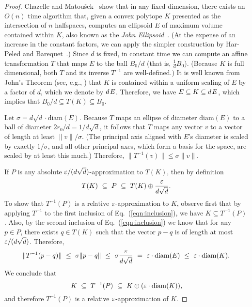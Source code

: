 \documentclass[11pt]{article}   \usepackage[letterpaper,hmargin=2.1cm,vmargin=3cm]{geometry}
\newcommand{\inv}[1]{\frac{1}{#1}}
\newcommand{\diam}{\mathrm{diam}}
\renewcommand{\P}{\kern+1pt}    \newcommand{\N}{\kern-2pt}      \newcommand{\NN}{\kern-4pt}     \newcommand{\polar}[1]{\mathrm{polar}(#1)}            \newcommand{\polarX}[2]{\mathrm{polar}_{#1}(#2)}
\begin{document}
\begin{proof}
Chazelle and Matou\v{s}ek~\cite{ChM96} show that in any fixed dimension, there exists an $O(n)$ time algorithm that, given a convex polytope $K$ presented as the intersection of $n$ halfspaces, computes an ellipsoid $E$ of maximum volume contained within $K$, also known as the \emph{John Ellipsoid}~\cite{Bal97}. (At the expense of an increase in the constant factors, we can apply the simpler construction by Har-Peled and Barequet~\cite{BHP-bbox}.) Since $d$ is fixed, in constant time we can compute an affine transformation $T$ that maps $E$ to the ball $B_0/d$ (that is, $\inv{d}B_0$). (Because $K$ is full dimensional, both $T$ and its inverse $T^{-1}$ are well-defined.) It is well known from John's Theorem (see, e.g., \cite{Bal97}) that $K$ is contained within a uniform scaling of $E$ by a factor of $d$, which we denote by $d \P E$. Therefore, we have $E \subseteq K \subseteq d \P E$, which implies that $B_0/d \subseteq T(K) \subseteq B_0$.

Let $\sigma = d \sqrt{d} \cdot \diam(E)$. Because $T$ maps an ellipse of diameter $\diam(E)$ to a ball of diameter $2 r_0/d = 1/d \sqrt{d}$, it follows that $T$ maps any vector $v$ to a vector of length at least $\|v\|/\sigma$. (The principal axis aligned with $E$'s diameter is scaled by exactly $1/\sigma$, and all other principal axes, which form a basis for the space, are scaled by at least this much.) Therefore, $\|T^{-1}(v)\| \le \sigma \|v\|$. 

If $P$ is any absolute $\varepsilon/(d \sqrt{d})$-approximation to $T(K)$, then by definition 
\begin{equation}
	T(K) 
		~ \subseteq ~ P 
		~ \subseteq ~ T(K) \oplus \frac{\varepsilon}{d \sqrt{d}}. \label{eqn:inclusion}
\end{equation}
To show that $T^{-1}(P)$ is a relative $\varepsilon$-approximation to $K$, observe first that by applying $T^{-1}$ to the first inclusion of Eq.~(\ref{eqn:inclusion}), we have $K \subseteq T^{-1}(P)$. Also, by the second inclusion of Eq.~(\ref{eqn:inclusion}) we know that for any $p \in P$, there exists $q \in T(K)$ such that the vector $p-q$ is of length at most $\varepsilon/(d \sqrt{d})$. Therefore, 
\[
	\|T^{-1} (p-q)\|
		~ \le ~ \sigma \|p-q\|
		~ \le ~ \sigma \frac{\eps}{d \sqrt{d}}
		~  =  ~ \eps \cdot \diam(E)
		~ \le ~ \eps \cdot \diam(K).
\]
We conclude that
\[
	K
		~ \subseteq ~ T^{-1}(P) 
		~ \subseteq ~ K \oplus (\eps \cdot \diam(K)),
\]
and therefore $T^{-1}(P)$ is a relative $\varepsilon$-approximation of $K$.
\end{proof}
\end{document}
